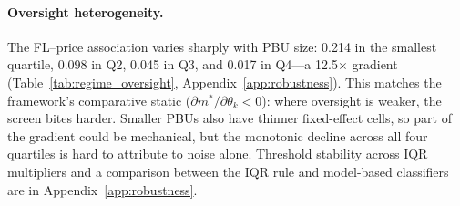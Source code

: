 \paragraph{Oversight heterogeneity.}
The FL--price association varies sharply with PBU size: 0.214 in the
smallest quartile, 0.098 in Q2, 0.045 in Q3, and 0.017 in Q4---a
12.5$\times$ gradient
(Table~\ref{tab:regime_oversight}, Appendix~\ref{app:robustness}).
This matches the framework's comparative static
($\partial m^*/\partial \theta_k < 0$): where oversight is weaker,
the screen bites harder. Smaller PBUs also have thinner fixed-effect
cells, so part of the gradient could be mechanical, but the monotonic
decline across all four quartiles is hard to attribute to noise
alone.
Threshold stability across IQR multipliers and a comparison between
the IQR rule and model-based classifiers are in
Appendix~\ref{app:robustness}.
